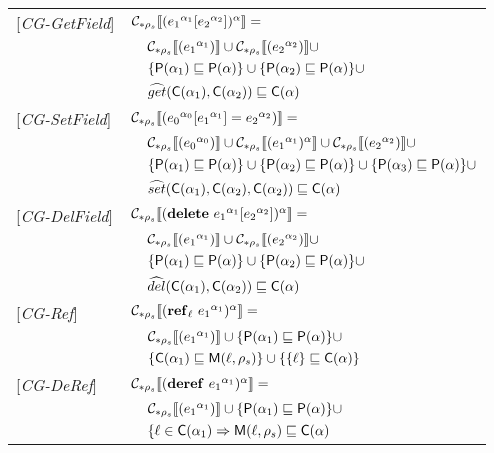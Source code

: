 \begin{table}[hbt]
\begin{tabular} {l l l l}
{[\textit{CG-GetField}]}&\multicolumn{3}{l}{$\genl {\lookup {\lbt 1} {\lbt 2}} = $}\\
&&\multicolumn{2}{l}{$ \gen {\lbt1} \cup \gen {\lbt 2} \cup$}\\
&&\multicolumn{2}{l}{$\braces{\Pel(\all_1) \sqsubseteq \Pel(\all)} \cup \braces{\Pel(\all_2) \sqsubseteq \Pel(\all)} \cup$} \\
&&\multicolumn{2}{l}{$\widehat{get} (\Cel(\all_1), \Cel(\all_2)) \sqsubseteq \Cel(\all)$} \\
{[\textit{CG-SetField}]}&\multicolumn{3}{l}{$\gen {\store {\lbt 0} {\lbt 1} {\lbt 2}} = $}\\
&&\multicolumn{2}{l}{$ \gen {\lbt 0} \cup \genl {\lbt 1} \cup \gen {\lbt 2} \cup $}\\
&&\multicolumn{2}{l}{$\braces{\Pel(\all_1) \sqsubseteq \Pel(\all)} \cup\braces{\Pel(\all_2) \sqsubseteq \Pel(\all)} \cup\braces{\Pel(\all_3) \sqsubseteq \Pel(\all)} \cup$} \\
&&\multicolumn{2}{l}{$\widehat{set} (\Cel(\all_1), \Cel(\all_2), \Cel(\all_2)) \sqsubseteq \Cel(\all)$} \\
{[\textit{CG-DelField}]}&\multicolumn{3}{l}{$\genl {\delete {\lbt 1} {\lbt 2}} = $}\\ 
&&\multicolumn{2}{l}{$ \gen {\lbt1} \cup \gen {\lbt 2} \cup$}\\
&&\multicolumn{2}{l}{$\braces{\Pel(\all_1) \sqsubseteq \Pel(\all)} \cup \braces{\Pel(\all_2) \sqsubseteq \Pel(\all)} \cup$} \\
&&\multicolumn{2}{l}{$\widehat{del} (\Cel(\all_1), \Cel(\all_2)) \sqsubseteq \Cel(\all)$}\\
{[\textit{CG-Ref}]}&\multicolumn{3}{l}{$ \genl {\newref {\ell} {\lbt 1}} = $}\\
&&\multicolumn{2}{l}{$\gen {\lbt 1} \cup\braces{\Pel(\all_1) \sqsubseteq \Pel(\all)} \cup$}\\
&&\multicolumn{2}{l}{$\braces{\Cel(\all_1) \sqsubseteq \Mel(\ell, \rho_s)} \cup \braces{\{\ell\} \sqsubseteq \Cel(\all)}$}\\
{[\textit{CG-DeRef}]}&\multicolumn{3}{l}{$\genl {\deref {\lbt 1}} = $}\\
&&\multicolumn{2}{l}{$ \gen {\lbt 1} \cup\braces{\Pel(\all_1) \sqsubseteq \Pel(\all)} \cup$}\\
&&\multicolumn{2}{l}{$\{\ell \in \Cel(\all_1) \Rightarrow \Mel(\ell, \rho_s) \sqsubseteq \Cel(\all)$} \\

\end{tabular}
\end{table}

